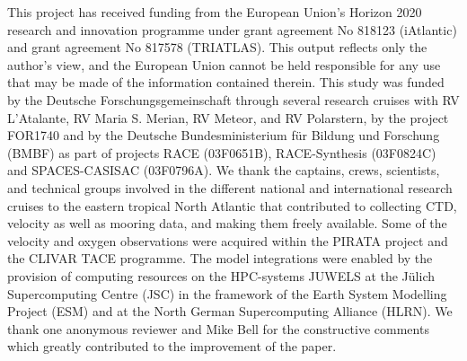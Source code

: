 \documentclass[os, manuscript]{copernicus}
\begin{document}
	
	
	
	\begin{acknowledgements}
		This project has received funding from the European Union’s Horizon 2020 research and innovation programme under grant agreement No 818123 (iAtlantic) and grant agreement No 817578 (TRIATLAS). This output reflects only the author’s view, and the European Union cannot be held responsible for any use that may be  made of the information contained therein. This study was funded by the Deutsche Forschungsgemeinschaft through several research cruises with RV L'Atalante, RV Maria S. Merian, RV Meteor, and RV Polarstern, by the project FOR1740 and by the Deutsche Bundesministerium f\"{u}r Bildung und Forschung (BMBF) as part of projects RACE (03F0651B), RACE-Synthesis (03F0824C) and SPACES-CASISAC (03F0796A). We thank the captains, crews, scientists, and technical groups involved in the different national and international research cruises to the eastern tropical North Atlantic that contributed to collecting CTD, velocity as well as mooring data, and making them freely available. Some of the velocity and oxygen observations were acquired within the PIRATA project and the CLIVAR TACE programme. The model integrations were enabled by the provision of computing resources on the HPC-systems JUWELS at the Jülich Supercomputing Centre (JSC) in the framework of the Earth System Modelling Project (ESM) and at the North German Supercomputing Alliance (HLRN). We thank one anonymous reviewer and Mike Bell for the constructive comments which greatly contributed to the improvement of the paper.
	\end{acknowledgements}
	
	
	
	
	
	
	
	
	
	
\end{document}
